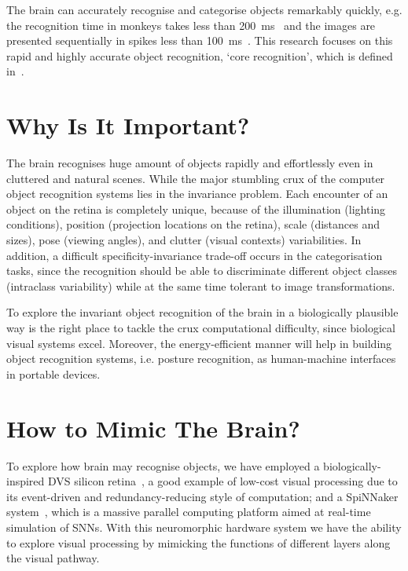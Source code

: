 The brain can accurately recognise and categorise objects remarkably quickly, e.g. the recognition time in monkeys takes less than 200~ms~\cite{fabre1998rapid} and the images are presented sequentially in spikes less than 100~ms~\cite{keysers2001speed}.
This research focuses on this rapid and highly accurate object recognition, `core recognition', which is defined in~\cite{dicarlo2007untangling}.


\section{Why Is It Important?}
\label{sec:imp}
The brain recognises huge amount of objects rapidly and effortlessly even in cluttered and natural scenes.
While the major stumbling crux of the computer object recognition systems lies in the invariance problem.
Each encounter of an object on the retina is completely unique, because of the illumination (lighting conditions), position (projection locations on the retina), scale (distances and sizes), pose (viewing angles), and clutter (visual contexts) variabilities.
In addition, a difficult specificity-invariance trade-off occurs in the categorisation tasks, since the recognition should be able to discriminate different object classes (intraclass variability) while at the same time tolerant to image transformations.   

To explore the invariant object recognition of the brain in a biologically plausible way is the right place to tackle the crux computational difficulty, since biological visual systems excel.
Moreover, the energy-efficient manner will help in building object recognition systems, i.e. posture recognition, as human-machine interfaces in portable devices.  

\section{How to Mimic The Brain?}
\label{sec:brn}
To explore how brain may recognise objects, we have employed a biologically-inspired DVS silicon retina~\cite{lenero20113}, a good example of low-cost visual processing due to its event-driven and redundancy-reducing style of computation;
and a SpiNNaker system~\cite{furber2014spinnaker}, which is a massive parallel computing platform aimed at real-time simulation of SNNs. 
With this neuromorphic hardware system we have the ability to explore visual processing by mimicking the functions of different layers along the visual pathway. 


